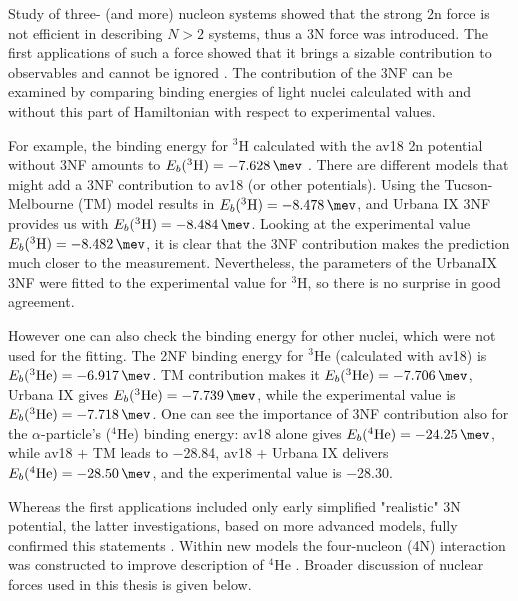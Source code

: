 Study of three- (and more) nucleon systems showed that
the strong \gls{2n} force is not efficient in describing
$N>2$ systems, thus a 3N force was introduced. The first applications of such
a force showed that it brings a
sizable contribution to observables and cannot be ignored \cite{GLOCKLE1982343}.
The contribution of the 3NF can be examined by
comparing binding energies of light nuclei calculated with
and without this part of Hamiltonian with respect to experimental values.

For example, the binding energy for $^3$H calculated with the \gls{av18} \gls{2n} potential 
without 3NF amounts to
$E_b(^3\mathrm{H}) = \SI{-7.628}{\mev}$ \cite{NoggaAV18}. There are different models that might add a 3NF
contribution to \gls{av18} (or other potentials). Using the Tucson-Melbourne (TM) model \cite{Tucson-Melbourne}
results in $E_b(^3\mathrm{H}) = \SI{-8.478}{\mev}$, and Urbana IX \cite{Urbana3NF} 3NF provides us with
$E_b(^3\mathrm{H}) = \SI{-8.484}{\mev}$. Looking at the experimental value $E_b(^3\mathrm{H}) = \SI{-8.482}{\mev}$,
it is clear that the 3NF contribution makes the prediction much closer to the measurement.
Nevertheless, the parameters of the UrbanaIX
3NF were fitted to the experimental value for $^3\mathrm{H}$, so there is no surprise in good agreement.

However one can also check the binding energy for other nuclei, which were not used for the fitting.
The 2NF binding energy for $^3$He
(calculated with \gls{av18}) is $E_b(^3\mathrm{He}) = \SI{-6.917}{\mev}$. TM contribution makes it
$E_b(^3\mathrm{He}) = \SI{-7.706}{\mev}$, Urbana IX gives $E_b(^3\mathrm{He}) = \SI{-7.739}{\mev}$, while the
experimental value is $E_b(^3\mathrm{He}) = \SI{-7.718}{\mev}$. One can see the importance of 3NF
contribution also for the $\alpha$-particle's ($^4\mathrm{He}$) binding energy:
\gls{av18} alone gives
$E_b(^4\mathrm{He}) = \SI{-24.25}{\mev}$, while \gls{av18} + TM leads to \SI{-28.84}{\mev},
\gls{av18} + Urbana IX delivers $E_b(^4\mathrm{He}) = \SI{-28.50}{\mev}$,
and the experimental value is \SI{-28.30}{\mev}\cite{NoggaAV18}.

Whereas the first applications included only early simplified "realistic" 3N potential, the latter
investigations, based on more advanced models, fully confirmed this statements \cite{StoksPhysRevC49, AV18Wiringa}.
Within new models the four-nucleon (4N) interaction was constructed to improve description of
$^4\mathrm{He}$ \cite{NoggaPhysRevLett}.
Broader discussion of nuclear forces used in this thesis is given below.

